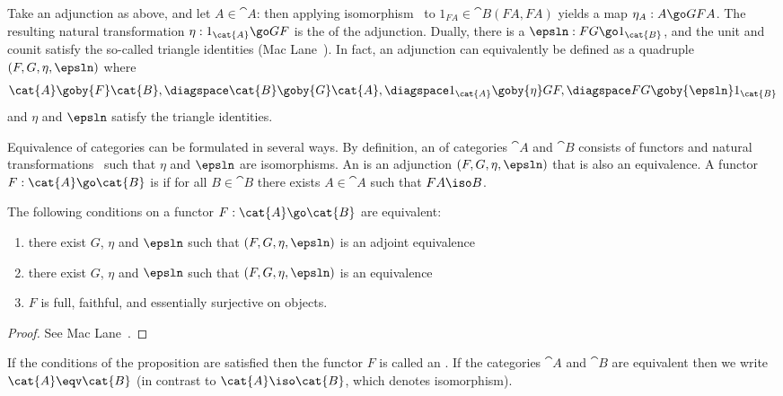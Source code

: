 Take an adjunction as above, and let $A \in \cat{A}$: then applying
isomorphism~ to $1_{FA} \in \cat{B}(FA, FA)$ yields a map
$\eta_A: A \go GFA$.  The resulting natural transformation $\eta: 1_\cat{A}
\go GF$ is the %
%
%
of the adjunction.  Dually, there is a
%
%
%
$\epsln: FG \go 1_\cat{B}$, and the unit and counit satisfy
the so-called triangle%
%
%
identities (Mac Lane~\cite[IV.1(9)]{MacCWM}).  In fact, an adjunction can
 equivalently be defined as a quadruple $(F, G, \eta, \epsln)$ where
%
\begin{equation}	\label{eq:adjn-data}
\cat{A} \goby{F} \cat{B},
\diagspace
\cat{B} \goby{G} \cat{A},
\diagspace
1_\cat{A} \goby{\eta} GF, 
\diagspace
FG \goby{\epsln} 1_\cat{B}
\end{equation}
%
and $\eta$ and $\epsln$ satisfy the triangle identities.

Equivalence of categories can be formulated in several ways.  By
definition, an %
%
%
of categories $\cat{A}$ and $\cat{B}$
consists of functors and natural transformations~ such
that $\eta$ and $\epsln$ are isomorphisms.  An 
is an adjunction $(F, G, \eta, \epsln)$ that is also an equivalence.  A
functor $F: \cat{A} \go \cat{B}$ is  if for all $B \in \cat{B}$ there exists $A \in \cat{A}$ such that
$FA \iso B$.
%
\begin{propn}	
The following conditions on a functor $F: \cat{A} \go \cat{B}$ are
equivalent: 
%
\begin{enumerate}
\item {}
there exist $G$, $\eta$ and $\epsln$ such that $(F, G, \eta, \epsln)$ is an
adjoint equivalence 
\item {}
there exist $G$, $\eta$ and $\epsln$ such that $(F, G, \eta, \epsln)$ is an
equivalence 
\item {}
$F$ is full, faithful, and essentially surjective on objects.
\end{enumerate}
\end{propn}
%
\begin{proof}
See Mac Lane~\cite[IV.4.1]{MacCWM}.  \done
\end{proof}
%
If the conditions of the proposition are satisfied then the functor $F$ is
called an .%
%
%
 If the categories $\cat{A}$ and $\cat{B}$
are equivalent then we write $\cat{A} \eqv \cat{B}$%
% 
%
(in contrast to
$\cat{A} \iso \cat{B}$, which denotes isomorphism).


